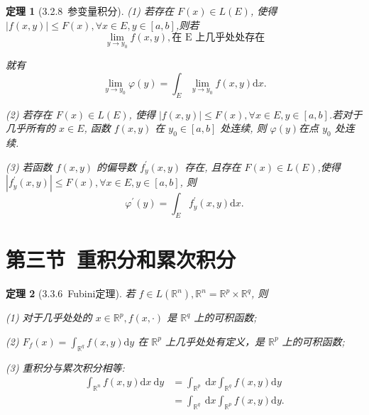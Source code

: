 \documentclass[10pt,openany]{book}
\theoremstyle{thmstyle} %
\newtheorem{theorem}{定理}[chapter]
\theoremstyle{defstyle} %
\theoremstyle{prostyle} %
\begin{document}
\begin{theorem}[3.2.8~参变量积分]
(1) 若存在 $F(x) \in L(E)$, 使得 $|f(x, y)| \leq F(x), \forall x \in E, y \in[a, b]$,则若
$$
\lim _{y \rightarrow y_0} f(x, y), \text{在 E 上几乎处处存在}
$$

就有
$$
\lim _{y \rightarrow y_0} \varphi(y)=\int_E \lim _{y \rightarrow y_0} f(x, y) \mathrm{d} x .
$$

(2) 若存在 $F(x) \in L(E)$, 使得 $|f(x, y)| \leq F(x), \forall x \in E, y \in[a, b]$.若对于几乎所有的 $x \in E$, 函数 $f(x, y)$ 在 $y_0 \in[a, b]$ 处连续, 则 $\varphi(y)$在点 $y_0$ 处连续.

(3) 若函数 $f(x, y)$ 的偏导数 $f_y^{\prime}(x, y)$ 存在, 且存在 $F(x) \in L(E)$,使得 $\left|f_y^{\prime}(x, y)\right| \leq F(x), \forall x \in E, y \in[a, b]$, 则
$$
\varphi^{\prime}(y)=\int_E f_y^{\prime}(x, y) \mathrm{d} x .
$$
\end{theorem}


\section{第三节~重积分和累次积分}

\begin{theorem}[3.3.6~Fubini定理]
若 $f \in L\left(\mathbb{R}^n\right), \mathbb{R}^n=\mathbb{R}^p \times \mathbb{R}^q$, 则

(1) 对于几乎处处的 $x \in \mathbb{R}^p, f(x, \cdot)$ 是 $\mathbb{R}^q$ 上的可积函数;

(2) $F_f(x)=\int_{\mathbb{R}^q} f(x, y) \mathrm{d} y$ 在 $\mathbb{R}^p$ 上几乎处处有定义，是 $\mathbb{R}^p$ 上的可积函数;

(3) 重积分与累次积分相等:
$$
\begin{aligned}
\int_{\mathbb{R}^n} f(x, y) \mathrm{d} x \mathrm{~d} y & =\int_{\mathbb{R}^p} \mathrm{~d} x \int_{\mathbb{R}^q} f(x, y) \mathrm{d} y \\
& =\int_{\mathbb{R}^q} \mathrm{~d} x \int_{\mathbb{R}^p} f(x, y) \mathrm{d} y .
\end{aligned}
$$
\end{theorem}
\end{document}
